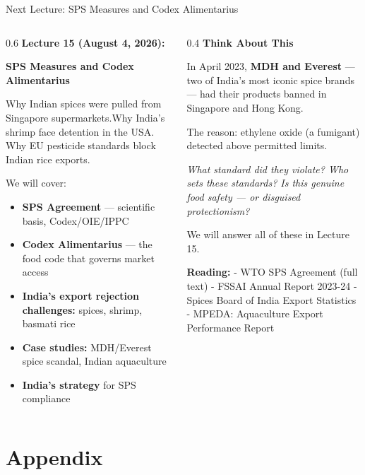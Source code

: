 \documentclass[
  ignorenonframetext,
  aspectratio=169,
]{beamer}
\makeatletter
\providecommand{\tightlist}{%
  \setlength{\itemsep}{0pt}\setlength{\parskip}{0pt}}
\let\quarto@originallabel\label
\DeclareRobustCommand*{\label}[1]{\quarto@originallabel{#1}}
\makeatother
\begin{document}
\begin{frame}{Next Lecture: SPS Measures and Codex Alimentarius}
\label{next-lecture-sps-measures-and-codex-alimentarius}
\begin{columns}[T]
\begin{column}{0.6\linewidth}
\textbf{Lecture 15 (August 4, 2026):}

\textbf{SPS Measures and Codex Alimentarius}

Why Indian spices were pulled from Singapore supermarkets.Why India's
shrimp face detention in the USA. Why EU pesticide standards block
Indian rice exports.

We will cover:

\begin{itemize}
\tightlist
\item
  \textbf{SPS Agreement} --- scientific basis, Codex/OIE/IPPC
\item
  \textbf{Codex Alimentarius} --- the food code that governs market
  access
\item
  \textbf{India's export rejection challenges:} spices, shrimp, basmati
  rice
\item
  \textbf{Case studies:} MDH/Everest spice scandal, Indian aquaculture
\item
  \textbf{India's strategy} for SPS compliance
\end{itemize}
\end{column}

\begin{column}{0.4\linewidth}
\textbf{Think About This}

In April 2023, \textbf{MDH and Everest} --- two of India's most iconic
spice brands --- had their products banned in Singapore and Hong Kong.

The reason: ethylene oxide (a fumigant) detected above permitted limits.

\emph{What standard did they violate? Who sets these standards? Is this
genuine food safety --- or disguised protectionism?}

We will answer all of these in Lecture 15.

\textbf{Reading:} - WTO SPS Agreement (full text) - FSSAI Annual Report
2023-24 - Spices Board of India Export Statistics - MPEDA: Aquaculture
Export Performance Report
\end{column}
\end{columns}
\end{frame}

\section{Appendix}\label{appendix}
\end{document}
